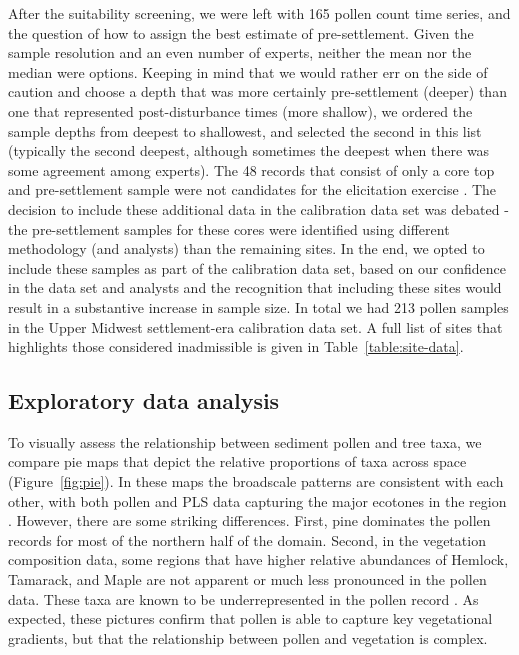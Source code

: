 \documentclass[12pt]{article}
\begin{document}
After the suitability screening, we were left with 165 pollen count
time series, and the question of how to assign the best estimate of
pre-settlement. Given the sample resolution and an even number of
experts, neither the mean nor the median were options. Keeping in mind
that we would rather err on the side of caution and choose a depth
that was more certainly pre-settlement (deeper) than one that
represented post-disturbance times (more shallow), we ordered the
sample depths from deepest to shallowest, and selected the second in
this list (typically the second deepest, although sometimes the
deepest when there was some agreement among experts).  The 48 records
that consist of only a core top and pre-settlement sample were not
candidates for the elicitation exercise . The decision to include
these additional data in the calibration data set was debated - the
pre-settlement samples for these cores were identified using different
methodology (and analysts) than the remaining sites. In the end, we
opted to include these samples as part of the calibration data set,
based on our confidence in the data set and analysts and the
recognition that including these sites would result in a substantive
increase in sample size. In total we had 213 pollen samples in the
Upper Midwest settlement-era calibration data set. A full list of
sites that highlights those considered inadmissible is given in
Table~\ref{table:site-data}.

\subsection{Exploratory data analysis}

To visually assess the relationship between sediment pollen and tree
taxa, we compare pie maps that depict the relative proportions of
taxa across space (Figure~\ref{fig:pie}). In these maps the broadscale
patterns are consistent with each other, with both pollen and PLS data
capturing the major ecotones in the region
\citep{solomon1985computer}.  However, there are some striking
differences. First, pine dominates the pollen records for most of the
northern half of the domain. Second, in the vegetation composition
data, some regions that have higher relative abundances of Hemlock,
Tamarack, and Maple are not apparent or much less pronounced in the
pollen data. These taxa are known to be underrepresented in the pollen
record \citep{XXX}. As expected, these pictures confirm that pollen is able
to capture key vegetational gradients, but that the relationship
between pollen and vegetation is complex.
\end{document}
